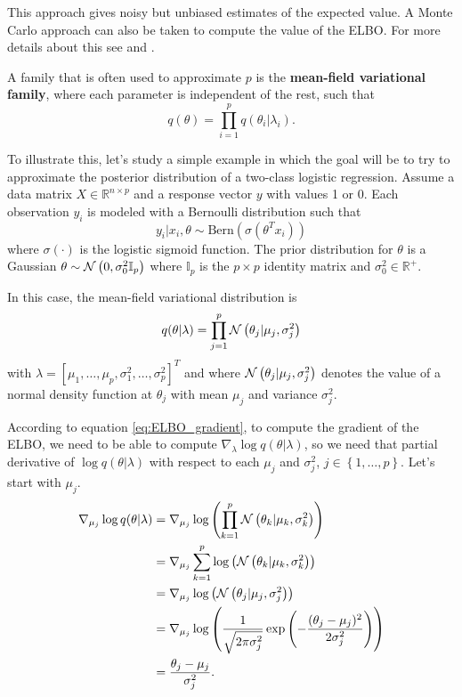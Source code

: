 This approach gives noisy but unbiased estimates of the expected value. A Monte Carlo approach can also be taken to compute the value of the ELBO. For more details about this see \cite{kucukelbir2017automatic} and \cite{ranganath2014black}.

A family that is often used to approximate $p$ is the \textbf{mean-field variational family}, where each parameter is independent of the rest, such that
\begin{equation}
  q(\theta) = \prod_{i = 1}^p q(\theta_i | \lambda_i).
\end{equation}

To illustrate this, let's study a simple example in which the goal will be to try to approximate the posterior distribution of a two-class logistic regression. Assume a data matrix $X \in \mathbb{R}^{n \times p}$ and a response vector $y$ with values 1 or 0. Each observation $y_i$ is modeled with a Bernoulli distribution such that
\begin{equation}
  y_i | x_i, \theta \sim \mathrm{Bern}(\sigma(\theta^T x_i))
\end{equation}
where $\sigma(\cdot)$ is the logistic sigmoid function. The prior distribution for $\theta$ is a Gaussian $\theta \sim \mathcal{N}\left( 0, \sigma_0^2 \mathbb{I}_p \right)$ where $\mathbb{I}_p$ is the $p \times p$ identity matrix and $\sigma_0^2 \in \mathbb{R}^+$.

In this case, the mean-field variational distribution is
\begin{equation}
  \label{eq:mean_field_normal_prior}
  q(\theta | \lambda) = \prod_{j = 1}^p \mathcal{N}\left( \theta_j | \mu_j, \sigma_j^2 \right)
 \end{equation}
with $\lambda = \left[ \mu_1, \hdots, \mu_p, \sigma_1^2, \hdots, \sigma_p^2 \right]^T$ and where $\mathcal{N}\left( \theta_j | \mu_j, \sigma_j^2 \right)$ denotes the value of a normal density function at $\theta_j$ with mean $\mu_j$ and variance $\sigma_j^2$.

According to equation \ref{eq:ELBO_gradient}, to compute the gradient of the ELBO, we need to be able to compute $\nabla_{\lambda} \log q(\theta | \lambda)$, so we need that partial derivative of $\log q(\theta | \lambda)$ with respect to each $\mu_j$ and $\sigma_j^2$, $j \in \left\{ 1, \hdots, p \right\}$. Let's start with $\mu_j$.
\begin{equation}
  \begin{split}
      \nabla_{\mu_j} \log q(\theta | \lambda) & =
      \nabla_{\mu_j} \log \left( \prod_{ k = 1}^p \mathcal{N}\left( \theta_k | \mu_k, \sigma_k^2 \right) \right) \\
      &= \nabla_{\mu_j} \sum_{ k = 1}^p \log \left( \mathcal{N}\left( \theta_k | \mu_k, \sigma_k^2 \right) \right) \\
      &= \nabla_{\mu_j} \log \left( \mathcal{N}\left( \theta_j | \mu_j, \sigma_j^2 \right) \right) \\
      &= \nabla_{\mu_j} \log \left( \frac{1}{\sqrt{2 \pi \sigma_j^2}} \exp \left( -\frac{(\theta_j - \mu_j)^2}{2 \sigma_j^2} \right) \right) \\
      &= \frac{\theta_j - \mu_j}{\sigma_j^2}.
  \end{split}
\end{equation}


